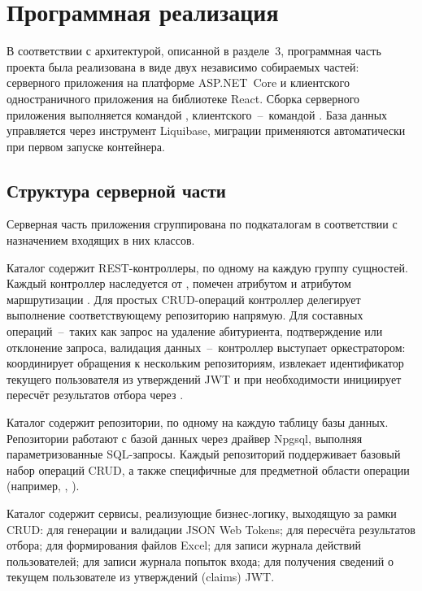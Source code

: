 \section{Программная реализация}

В соответствии с архитектурой, описанной в разделе~3, программная часть проекта была реализована в виде двух независимо собираемых частей: серверного приложения на платформе ASP.NET~Core и клиентского одностраничного приложения на библиотеке React.
Сборка серверного приложения выполняется командой , клиентского~--~командой .
База данных управляется через инструмент Liquibase, миграции применяются автоматически при первом запуске контейнера.

\subsection{Структура серверной части}

Серверная часть приложения сгруппирована по подкаталогам в соответствии с назначением входящих в них классов.

Каталог  содержит REST-контроллеры, по одному на каждую группу сущностей.
Каждый контроллер наследуется от , помечен атрибутом \code{[ApiController]} и атрибутом маршрутизации .
Для простых CRUD-операций контроллер делегирует выполнение соответствующему репозиторию напрямую.
Для составных операций~--~таких как запрос на удаление абитуриента, подтверждение или отклонение запроса, валидация данных~--~контроллер выступает оркестратором: координирует обращения к нескольким репозиториям, извлекает идентификатор текущего пользователя из утверждений JWT и при необходимости инициирует пересчёт результатов отбора через .

Каталог  содержит репозитории, по одному на каждую таблицу базы данных.
Репозитории работают с базой данных через драйвер Npgsql, выполняя параметризованные SQL-запросы.
Каждый репозиторий поддерживает базовый набор операций CRUD, а также специфичные для предметной области операции (например, , ).

Каталог  содержит сервисы, реализующие бизнес-логику, выходящую за рамки CRUD:  для генерации и валидации JSON Web Tokens;  для пересчёта результатов отбора;  для формирования файлов Excel;  для записи журнала действий пользователей;  для записи журнала попыток входа;  для получения сведений о текущем пользователе из утверждений (claims) JWT.

